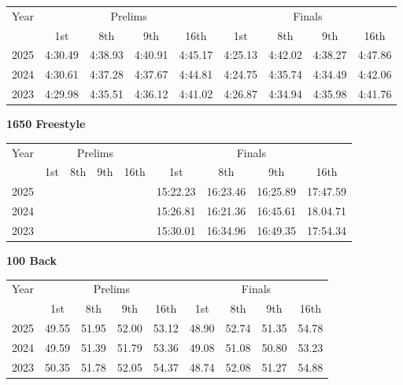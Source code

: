 \begin{flushleft}
\begin{tabular}{|c|c|c|c|c|c|c|c|c|}
\hline
Year & \multicolumn{4}{c|}{Prelims} & \multicolumn{4}{c|}{Finals} \\
\cline{2-9}
& 1st & 8th & 9th & 16th & 1st & 8th & 9th & 16th \\
\hline
2025 & 4:30.49 & 4:38.93 & 4:40.91 & 4:45.17 & 4:25.13 & 4:42.02 & 4:38.27 & 4:47.86 \\
2024 & 4:30.61 & 4:37.28 & 4:37.67 & 4:44.81 & 4:24.75 & 4:35.74 & 4:34.49 & 4:42.06 \\
2023 & 4:29.98 & 4:35.51 & 4:36.12 & 4:41.02 & 4:26.87 & 4:34.94 & 4:35.98 & 4:41.76 \\
\hline
\end{tabular}
\end{flushleft}

\textbf{1650 Freestyle}

\begin{flushleft}
\begin{tabular}{|c|c|c|c|c|c|c|c|c|}
\hline
Year & \multicolumn{4}{c|}{Prelims} & \multicolumn{4}{c|}{Finals} \\
\cline{2-9}
& 1st & 8th & 9th & 16th & 1st & 8th & 9th & 16th \\
\hline
2025 &  &  &  &  & 15:22.23 & 16:23.46 & 16:25.89 & 17:47.59 \\
2024 &  &  &  &  & 15:26.81 & 16:21.36 & 16:45.61 & 18.04.71 \\
2023 &  &  &  &  & 15:30.01 & 16:34.96 & 16:49.35 & 17:54.34 \\
\hline
\end{tabular}
\end{flushleft}

\textbf{100 Back}

\begin{flushleft}
\begin{tabular}{|c|c|c|c|c|c|c|c|c|}
\hline
Year & \multicolumn{4}{c|}{Prelims} & \multicolumn{4}{c|}{Finals} \\
\cline{2-9}
& 1st & 8th & 9th & 16th & 1st & 8th & 9th & 16th \\
\hline
2025 & 49.55 & 51.95 & 52.00 & 53.12 & 48.90 & 52.74 & 51.35 & 54.78 \\
2024 & 49.59 & 51.39 & 51.79 & 53.36 & 49.08 & 51.08 & 50.80 & 53.23 \\
2023 & 50.35 & 51.78 & 52.05 & 54.37 & 48.74 & 52.08 & 51.27 & 54.88 \\
\hline
\end{tabular}
\end{flushleft}

